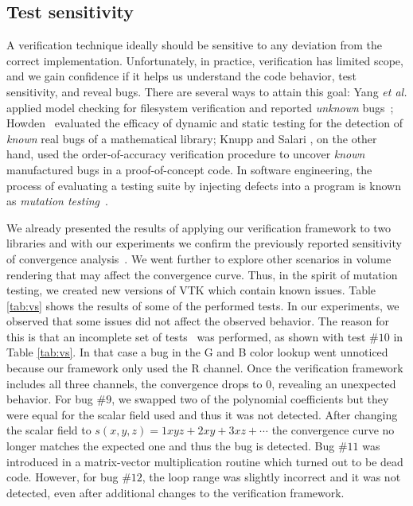 \subsection{Test sensitivity}
\label{sec:test-sesitivity}

A verification technique ideally should be sensitive to any deviation
from the correct implementation. Unfortunately, in practice,
verification has limited scope, and we gain confidence if it helps us
understand the code behavior, test sensitivity, and reveal bugs. There
are several ways to attain this goal: Yang \emph{et al.} applied model
checking for filesystem verification and reported \emph{unknown}
bugs~\cite{Yang:2006:UMC:1189256.1189259};
Howden~\cite{Howden:1980:ASV:357103.357107} evaluated the efficacy of
dynamic and static testing for the detection of \emph{known} real bugs
of a mathematical library; Knupp and Salari \cite{KnuppSalari02}, on
the other hand, used the order-of-accuracy verification procedure to
uncover \emph{known} manufactured bugs in a proof-of-concept code.  In
software engineering, the process of evaluating a testing suite by
injecting defects into a program is known as \emph{mutation
  testing}~\cite{Riley:2009:BTL:1667105}.

We already presented the results of applying our verification
framework to two libraries and with our experiments we confirm the
previously reported sensitivity of convergence
analysis~\cite{Roy2005}. We went further to explore other scenarios in
volume rendering that may affect the convergence curve. Thus, in the
spirit of mutation testing, we created new versions of VTK which
contain known issues. Table \ref{tab:vs} shows the results of some of
the performed tests. In our experiments, we observed that some issues
did not affect the observed behavior.  The reason for this is that an
incomplete set of tests~\cite{KnuppSalari02} was performed, as shown
with test $\#10$ in Table \ref{tab:vs}. In that case a bug in the G
and B color lookup went unnoticed because our framework only used the
R channel. Once the verification framework includes all three
channels, the convergence drops to $0$, revealing an unexpected
behavior. For bug $\#9$, we swapped two of the polynomial coefficients
but they were equal for the scalar field used and thus it was not
detected. After changing the scalar field to $s(x,y,z) = 1xyz + 2xy +
3xz + \cdots$ the convergence curve no longer matches the expected one
and thus the bug is detected. Bug $\#11$ was introduced in a
matrix-vector multiplication routine which turned out to be dead
code. However, for bug $\#12$, the loop range was slightly incorrect
and it was not detected, even after additional changes to the
verification framework.

